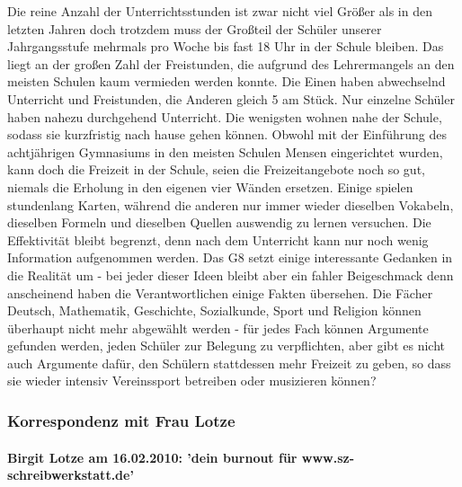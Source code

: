 \documentclass[a4paper,12pt,twoside]{scrbook}
\begin{document}
Die reine Anzahl der Unterrichtsstunden ist zwar nicht viel Größer als in den letzten Jahren doch trotzdem muss der Großteil der Schüler unserer Jahrgangsstufe mehrmals pro Woche bis fast 18 Uhr in der Schule bleiben. Das liegt an der großen Zahl der Freistunden, die aufgrund des Lehrermangels an den meisten Schulen kaum vermieden werden konnte. Die Einen haben abwechselnd Unterricht und Freistunden, die Anderen gleich 5 am Stück. Nur einzelne Schüler haben nahezu durchgehend Unterricht. Die wenigsten wohnen nahe der Schule, sodass sie kurzfristig nach hause gehen können. Obwohl mit der Einführung des achtjährigen Gymnasiums in den meisten Schulen Mensen eingerichtet wurden, kann doch die Freizeit in der Schule, seien die Freizeitangebote noch so gut, niemals die Erholung in den eigenen vier Wänden ersetzen. Einige spielen stundenlang Karten, während die anderen nur immer wieder dieselben Vokabeln, dieselben Formeln und dieselben Quellen auswendig zu lernen versuchen. Die Effektivität bleibt begrenzt, denn nach dem Unterricht kann nur noch wenig Information aufgenommen werden.
Das G8 setzt einige interessante Gedanken in die Realität um - bei jeder dieser Ideen bleibt aber ein fahler Beigeschmack denn anscheinend haben die Verantwortlichen einige Fakten übersehen. Die Fächer Deutsch, Mathematik, Geschichte, Sozialkunde, Sport und Religion können überhaupt nicht mehr abgewählt werden - für jedes Fach können Argumente gefunden werden, jeden Schüler zur Belegung zu verpflichten, aber gibt es nicht auch Argumente dafür, den Schülern stattdessen mehr Freizeit zu geben, so dass sie wieder intensiv Vereinssport betreiben oder musizieren können?
\subsubsection{Korrespondenz mit Frau Lotze}
\paragraph{Birgit Lotze am 16.02.2010: 'dein burnout für www.sz-schreibwerkstatt.de'}
\end{document}
